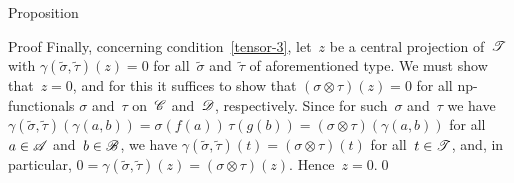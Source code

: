\documentclass[a]{subfiles}
\begin{document}
\begin{parsec}
\begin{point}{Proposition}
\begin{point}{Proof}
Finally,
concerning
condition~\ref{tensor-3},
let~$z$ be a central projection of~$\mathscr{T}$
with $\gamma(\tilde\sigma,\tilde\tau)(z)=0$
for all~$\tilde\sigma$
and~$\tilde\tau$ of aforementioned type.
We must show that~$z=0$,
and for this
it suffices to show that
$(\sigma\otimes \tau)(z)=0$
for all  np-functionals
$\sigma$ and~$\tau$ on~$\mathscr{C}$ and~$\mathscr{D}$,
respectively.
Since for such~$\sigma$ and~$\tau$
we have
$\gamma(\tilde\sigma,\tilde\tau)
(\gamma(a,b))
 = 
 \sigma(f(a))\,\tau(g(b))
 = (\sigma\otimes\tau)(\gamma(a,b))$
 for all~$a\in\mathscr{A}$ and~$b\in\mathscr{B}$,
 we have $\gamma(\tilde\sigma,\tilde\tau)
 (t) = (\sigma\otimes \tau)(t)$
 for all~$t\in\mathscr{T}$,
 and, in particular,
 $0=\gamma(\tilde\sigma,\tilde\tau)(z)
 = (\sigma\otimes\tau)(z)$.
 Hence~$z=0$.\qed
\end{point}
\end{point}
\end{parsec}%
\end{document}
